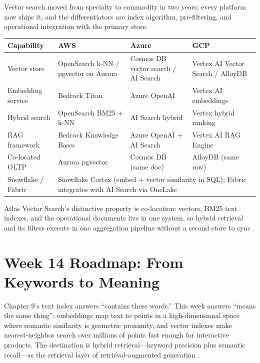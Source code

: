 \begin{crosscloud}
Vector search moved from specialty to commodity in two years; every platform now ships it, and the differentiators are index algorithm, pre-filtering, and operational integration with the primary store.

\vspace{2mm}
{\footnotesize
\begin{tabular}{@{}p{2.9cm}p{3.0cm}p{3.0cm}p{3.0cm}@{}} 
\toprule
\textbf{Capability} & \textbf{AWS} & \textbf{Azure} & \textbf{GCP} \\
\midrule
Vector store & OpenSearch k-NN / pgvector on Aurora & Cosmos DB vector search / AI Search & Vertex AI Vector Search / AlloyDB \\
Embedding service & Bedrock Titan & Azure OpenAI & Vertex AI embeddings \\
Hybrid search & OpenSearch BM25 + k-NN & AI Search hybrid & Vertex hybrid ranking \\
RAG framework & Bedrock Knowledge Bases & Azure OpenAI + AI Search & Vertex AI RAG Engine \\
Co-located OLTP & Aurora pgvector & Cosmos DB (same doc) & AlloyDB (same row) \\
\addlinespace
Snowflake / Fabric & \multicolumn{3}{l}{Snowflake Cortex (embed + vector similarity in SQL); Fabric integrates with AI Search via OneLake} \\
\bottomrule
\end{tabular}}

\vspace{1mm}
Atlas Vector Search's distinctive property is co-location: vectors, BM25 text indexes, and the operational documents live in one system, so hybrid retrieval and its filters execute in one aggregation pipeline without a second store to sync \cite{mongodbAtlasVectorSearch,mongodbAtlasSearchDocs}.
\end{crosscloud}

\section{Week 14 Roadmap: From Keywords to Meaning}
Chapter 9's text index answers ``contains these words.'' This week answers ``means the same thing'': embeddings map text to points in a high-dimensional space where semantic similarity is geometric proximity, and vector indexes make nearest-neighbor search over millions of points fast enough for interactive products. The destination is hybrid retrieval---keyword precision plus semantic recall---as the retrieval layer of retrieval-augmented generation \cite{mongodbAtlasVectorSearch}.

